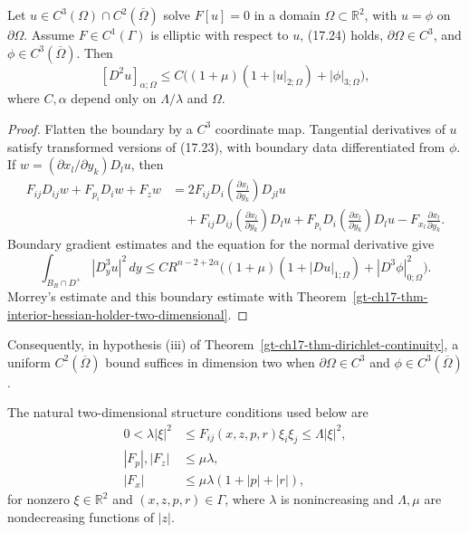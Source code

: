 \begin{theorem}
\label{gt-ch17-thm-global-hessian-holder-two-dimensional}
Let $u\in C^3(\Omega)\cap C^2(\overline\Omega)$ solve $F[u]=0$ in a domain
$\Omega\subset\mathbb R^2$, with $u=\phi$ on $\partial\Omega$.  Assume
$F\in C^1(\Gamma)$ is elliptic with respect to $u$, (17.24) holds,
$\partial\Omega\in C^3$, and $\phi\in C^3(\overline\Omega)$.  Then
\begin{equation}\tag{17.28}
[D^2u]_{\alpha;\Omega}\le
C\bigl((1+\mu)(1+|u|_{2;\Omega})+|\phi|_{3;\Omega}\bigr),
\end{equation}
where $C,\alpha$ depend only on $\Lambda/\lambda$ and $\Omega$.
\end{theorem}
\begin{proof}
\sketch Flatten the boundary by a $C^3$ coordinate map.  Tangential
derivatives of $u$ satisfy transformed versions of (17.23), with boundary
data differentiated from $\phi$. If
$w=(\partial x_l/\partial y_k)D_lu$, then
\begin{equation}
\tag{17.26}
\begin{aligned}
F_{ij}D_{ij}w+F_{p_i}D_iw+F_zw
&=2F_{ij}D_i\left(\frac{\partial x_l}{\partial y_k}\right)D_{jl}u\\
&\quad+F_{ij}D_{ij}\left(\frac{\partial x_l}{\partial y_k}\right)D_lu
+F_{p_i}D_i\left(\frac{\partial x_l}{\partial y_k}\right)D_lu
-F_{x_l}\frac{\partial x_l}{\partial y_k}.
\end{aligned}
\end{equation}
Boundary gradient estimates and the
equation for the normal derivative give
\begin{equation}
\tag{17.27}
\int_{B_R\cap D^+}|D_y^3u|^2\,dy
\leq CR^{n-2+2\alpha}
\bigl((1+\mu)(1+|Du|_{1;\Omega})+|D^3\phi|_{0;\Omega}^2\bigr).
\end{equation}
Morrey's estimate and
this boundary estimate with
Theorem~\ref{gt-ch17-thm-interior-hessian-holder-two-dimensional}.
\end{proof}

Consequently, in hypothesis (iii) of
Theorem~\ref{gt-ch17-thm-dirichlet-continuity}, a uniform
$C^2(\overline\Omega)$ bound suffices in dimension two when
$\partial\Omega\in C^3$ and $\phi\in C^3(\overline\Omega)$.

The natural two-dimensional structure conditions used below are
\begin{equation}\tag{17.29}
\begin{aligned}
0<\lambda|\xi|^2&\le F_{ij}(x,z,p,r)\xi_i\xi_j\le\Lambda|\xi|^2,\\
|F_p|,|F_z|&\le\mu\lambda,\\
|F_x|&\le\mu\lambda(1+|p|+|r|),
\end{aligned}
\end{equation}
for nonzero $\xi\in\mathbb R^2$ and $(x,z,p,r)\in\Gamma$, where $\lambda$
is nonincreasing and $\Lambda,\mu$ are nondecreasing functions of $|z|$.

